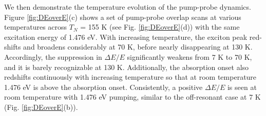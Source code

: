 \documentclass[
 reprint,
superscriptaddress,

 amsmath,amssymb,
 aps,

]{revtex4-2}
\begin{document}
We then demonstrate the temperature evolution of the pump-probe dynamics. Figure \ref{fig:DEoverE}(c) shows a set of pump-probe overlap scans at various temperatures across $T_N$ = 155 K (see Fig. \ref{fig:DEoverE}(d)) with the same excitation energy of 1.476 eV. With increasing temperature, the exciton peak red-shifts and broadens considerably at 70 K, before nearly disappearing at 130 K\cite{Kang2020,Wang2021,Hwangbo2021,Kim2023}. Accordingly, the suppression in $\Delta E/E$ significantly weakens from 7 K to 70 K, and it is barely recognizable at 130 K. Additionally, the absorption onset also redshifts continuously with increasing temperature so that at room temperature 1.476 eV is above the absorption onset\cite{Ho2021}. Consistently, a positive $\Delta E/E$ is seen at room temperature with 1.476 eV pumping, similar to the off-resonant case at 7 K (Fig. \ref{fig:DEoverE}(b)).
\end{document}

